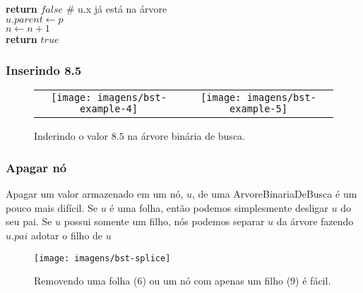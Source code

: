 \documentclass{beamer}
\begin{document}
\begin{frame}[shrink]
\begin{oframed}
\begin{flushleft}
\hspace*{1em} \hspace*{1em} \hspace*{1em} \hspace*{1em} {\color{black} \textbf{return}} \ensuremath{\ensuremath{\mathit{false}}} {\color{green}\# u.x já está na árvore}\\
\hspace*{1em} \hspace*{1em} \hspace*{1em} \ensuremath{\ensuremath{\mathit{u}}.\ensuremath{parent} \gets  \ensuremath{p}}\\
\hspace*{1em} \hspace*{1em} \ensuremath{\ensuremath{\mathit{n}} \gets  \ensuremath{\ensuremath{\mathit{n}} + 1}}\\
\hspace*{1em} \hspace*{1em} {\color{black} \textbf{return}} \ensuremath{\ensuremath{\mathit{true}}}  \\
\end{flushleft}
\end{oframed}
\end{frame}

\begin{frame}
\frametitle{Inserindo 8.5}
\begin{figure}
  \begin{center}
    \begin{tabular}{cc}
    \texttt{[image: imagens/bst-example-4]} &
    \texttt{[image: imagens/bst-example-5]} 
    \end{tabular}
  \end{center}
  \caption{Inderindo o valor $8.5$ na árvore binária de busca.}
\end{figure}
\end{frame}

\begin{frame}
\frametitle{Apagar nó}
Apagar um valor armazenado em um nó, \ensuremath{\ensuremath{\ensuremath{\mathit{u}}}}, de uma ArvoreBinariaDeBusca é um pouco mais difícil.  Se \ensuremath{\ensuremath{\ensuremath{\mathit{u}}}} é uma folha, então podemos simplesmente desligar \ensuremath{\ensuremath{\ensuremath{\mathit{u}}}} do seu pai.  Se \ensuremath{\ensuremath{\ensuremath{\mathit{u}}}} possui somente um filho, nós podemos separar \ensuremath{\ensuremath{\ensuremath{\mathit{u}}}} da árvore fazendo \ensuremath{\ensuremath{\ensuremath{\mathit{u}}.\ensuremath{\mathit{pai}}}} adotar o filho de \ensuremath{\ensuremath{\ensuremath{\mathit{u}}}}
\begin{figure}
  \begin{center}
    \texttt{[image: imagens/bst-splice]}
  \end{center}
  \caption{Removendo uma folha ($6$) ou um nó com apenas um filho ($9$) é fácil.}
\end{figure}
\end{frame}
\end{document}
